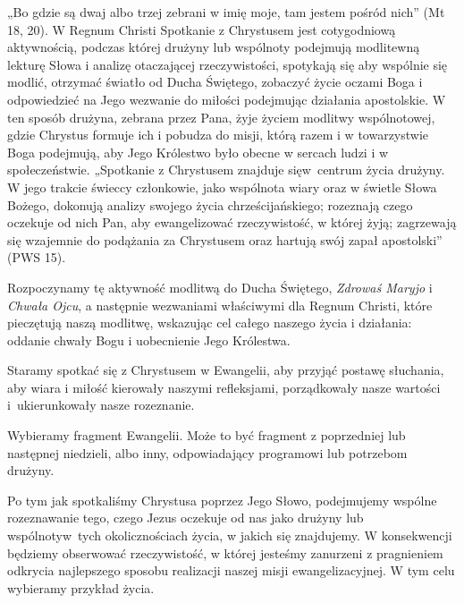 ﻿\documentclass[9pt,twoside]{extarticle}
\begin{document}
{\hnr „Bo gdzie są dwaj albo trzej zebrani w imię moje, tam jestem pośród nich” (Mt 18, 20). W Regnum Christi Spotkanie z Chrystusem jest cotygodniową aktywnością, podczas której drużyny lub wspólnoty podejmują modlitewną lekturę Słowa i analizę otaczającej rzeczywistości, spotykają się aby wspólnie się modlić, otrzymać światło od Ducha Świętego, zobaczyć życie oczami Boga i odpowiedzieć na Jego wezwanie do miłości podejmując działania apostolskie. W ten sposób drużyna, zebrana przez Pana, żyje życiem modlitwy wspólnotowej, gdzie Chrystus formuje ich i pobudza do misji, którą razem i w towarzystwie Boga podejmują, aby Jego Królestwo było obecne w sercach ludzi i w społeczeństwie.
„Spotkanie z Chrystusem znajduje się\linebreak w~centrum życia drużyny. W jego trakcie świeccy członkowie, jako wspólnota wiary oraz w świetle Słowa Bożego, dokonują analizy swojego życia chrześcijańskiego; rozeznają czego oczekuje od nich Pan, aby ewangelizować rzeczywistość, w której żyją; zagrzewają się wzajemnie do podążania za Chrystusem oraz hartują swój zapał apostolski” (PWS 15).




Rozpoczynamy tę aktywność modlitwą do Ducha Świętego, {\em Zdrowaś Maryjo} i {\em Chwała Ojcu}, a następnie wezwaniami właściwymi dla Regnum Christi, które pieczętują naszą modlitwę, wskazując cel całego naszego życia i działania: oddanie chwały Bogu i uobecnienie Jego Królestwa.




Staramy spotkać się z Chrystusem w Ewangelii, aby przyjąć postawę słuchania, aby wiara i miłość kierowały naszymi refleksjami, porządkowały nasze wartości i~ukierunkowały nasze rozeznanie.


Wybieramy fragment Ewangelii. Może to być fragment z poprzedniej lub następnej niedzieli, albo inny, odpowiadający programowi lub potrzebom drużyny.




Po tym jak spotkaliśmy Chrystusa poprzez Jego Słowo, podejmujemy wspólne rozeznawanie tego, czego Jezus oczekuje od nas jako drużyny lub wspólnoty\linebreak w~tych okolicznościach życia, w jakich się znajdujemy. W konsekwencji będziemy obserwować rzeczywistość, w której jesteśmy zanurzeni z pragnieniem odkrycia najlepszego sposobu realizacji naszej misji ewangelizacyjnej. W tym celu wybieramy przykład życia.


}
\end{document}
